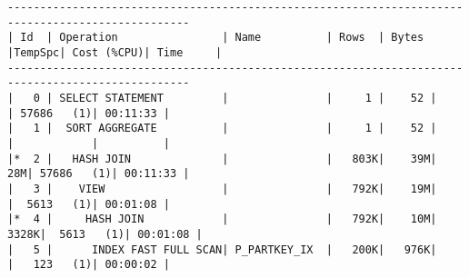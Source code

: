 \documentclass[11pt,a4paper,parskip=half]{scrartcl}
\begin{document}
\begin{lstlisting}
--------------------------------------------------------------------------------------------------                                                                                                                                                                                                           
| Id  | Operation                | Name          | Rows  | Bytes |TempSpc| Cost (%CPU)| Time     |                                                                                                                                                                                                           
--------------------------------------------------------------------------------------------------                                                                                                                                                                                                           
|   0 | SELECT STATEMENT         |               |     1 |    52 |       | 57686   (1)| 00:11:33 |                                                                                                                                                                                                           
|   1 |  SORT AGGREGATE          |               |     1 |    52 |       |            |          |                                                                                                                                                                                                           
|*  2 |   HASH JOIN              |               |   803K|    39M|    28M| 57686   (1)| 00:11:33 |                                                                                                                                                                                                           
|   3 |    VIEW                  |               |   792K|    19M|       |  5613   (1)| 00:01:08 |                                                                                                                                                                                                           
|*  4 |     HASH JOIN            |               |   792K|    10M|  3328K|  5613   (1)| 00:01:08 |                                                                                                                                                                                                           
|   5 |      INDEX FAST FULL SCAN| P_PARTKEY_IX  |   200K|   976K|       |   123   (1)| 00:00:02 |                                                                                                                                                                                                           

\end{lstlisting}
\end{document}

